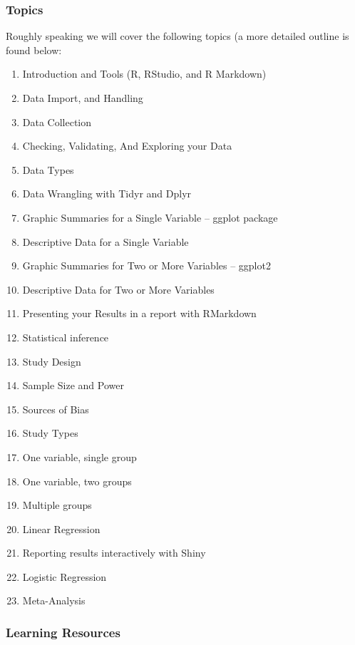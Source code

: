 \documentclass[]{book}
\providecommand{\tightlist}{%
  \setlength{\itemsep}{0pt}\setlength{\parskip}{0pt}}
\theoremstyle{definition}
\theoremstyle{definition}
\theoremstyle{definition}
\theoremstyle{remark}
\begin{document}
\hypertarget{topics}{%
\subsubsection{Topics}\label{topics}}

Roughly speaking we will cover the following topics (a more detailed
outline is found below:

\begin{enumerate}
\def\labelenumi{\arabic{enumi}.}
\tightlist
\item
  Introduction and Tools (R, RStudio, and R Markdown)
\item
  Data Import, and Handling
\item
  Data Collection
\item
  Checking, Validating, And Exploring your Data
\item
  Data Types
\item
  Data Wrangling with Tidyr and Dplyr
\item
  Graphic Summaries for a Single Variable -- ggplot package
\item
  Descriptive Data for a Single Variable
\item
  Graphic Summaries for Two or More Variables -- ggplot2
\item
  Descriptive Data for Two or More Variables
\item
  Presenting your Results in a report with RMarkdown
\item
  Statistical inference
\item
  Study Design
\item
  Sample Size and Power
\item
  Sources of Bias
\item
  Study Types
\item
  One variable, single group
\item
  One variable, two groups
\item
  Multiple groups
\item
  Linear Regression
\item
  Reporting results interactively with Shiny
\item
  Logistic Regression
\item
  Meta-Analysis 
\end{enumerate}

\hypertarget{learning-resources}{%
\subsubsection{Learning Resources}\label{learning-resources}}
\end{document}
